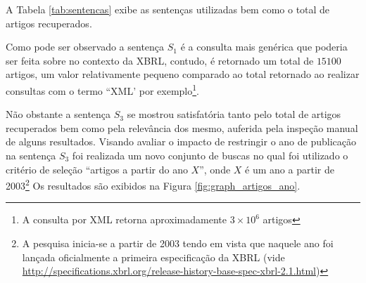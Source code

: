 \documentclass{article}
\begin{document}
A Tabela \ref{tab:sentencas} exibe as sentenças utilizadas bem como o total de artigos recuperados.
\begin{table}[htb]
\centering
{}
\caption{Total de artigos por sentença}
\label{tab:sentencas}
\end{table}

Como pode ser observado a sentença $S_1$ é a consulta mais genérica
que poderia ser feita sobre no contexto da XBRL, contudo, é retornado
um total de $15100$ artigos, um valor relativamente pequeno comparado ao total retornado ao realizar consultas com o termo ``XML' por exemplo\footnote{A consulta por XML retorna aproximadamente $3 \times 10^{6}$ artigos}.

Não obstante a sentença $S_3$ se mostrou satisfatória tanto pelo total
de artigos recuperados bem como pela relevância dos mesmo, auferida
pela inspeção manual de alguns resultados. Visando avaliar o impacto
de restringir o ano de publicação na sentença $S_3$ foi realizada um
novo conjunto de buscas no qual foi utilizado o critério de seleção
``artigos a partir do ano $X$'', onde $X$ é um ano a partir de 2003\footnote{A
  pesquisa inicia-se a partir de 2003 tendo em vista que naquele ano foi
  lançada oficialmente a primeira especificação da XBRL (vide \url{http://specifications.xbrl.org/release-history-base-spec-xbrl-2.1.html})}  Os resultados são exibidos na Figura \ref{fig:graph_artigos_ano}{}.
\end{document}
